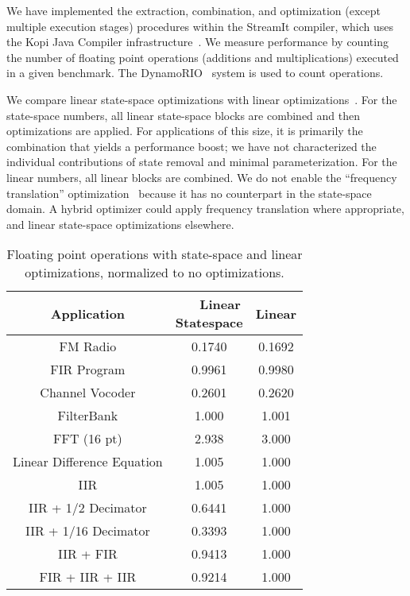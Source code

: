 \label{sec:results}

We have implemented the extraction, combination, and optimization
(except multiple execution stages) procedures within the StreamIt
compiler, which uses the Kopi Java Compiler
infrastructure~\cite{kopi}. We measure performance by counting the
number of floating point operations (additions and multiplications)
executed in a given benchmark. The DynamoRIO~\cite{dynamo} system is
used to count operations.

We compare linear state-space optimizations with linear
optimizations~\cite{Lamb}.  For the state-space numbers, all linear
state-space blocks are combined and then optimizations are applied.
For applications of this size, it is primarily the combination that
yields a performance boost; we have not characterized the individual
contributions of state removal and minimal parameterization.  For the
linear numbers, all linear blocks are combined.  We do not enable the
``frequency translation'' optimization~\cite{Lamb} because it has no
counterpart in the state-space domain.  A hybrid optimizer could apply
frequency translation where appropriate, and linear state-space
optimizations elsewhere.

\begin{table}[tbp]
\begin{center}
\begin{tabular} {c|c|c}
{\bf Application} & \parbox{0.65in}{{\bf ~~~Linear} \\ {\bf Statespace}} & {\bf Linear} \\ \hline
FM Radio & 0.1740 & 0.1692 \\
FIR Program &  0.9961 & 0.9980 \\
Channel Vocoder & 0.2601 & 0.2620 \\
FilterBank & 1.000 & 1.001 \\
FFT (16 pt) & 2.938 & 3.000 \\
Linear Difference Equation & 1.005 & 1.000 \\
IIR & 1.005 & 1.000 \\
IIR + 1/2 Decimator & 0.6441 & 1.000 \\
IIR + 1/16 Decimator & 0.3393 & 1.000 \\
IIR + FIR & 0.9413 & 1.000 \\
FIR + IIR + IIR & 0.9214 & 1.000
\end{tabular}
\caption{Floating point operations with state-space and linear
optimizations, normalized to no optimizations.\protect\label{tab:results}}
\end{center}
\vspace{-12pt}
\end{table}

